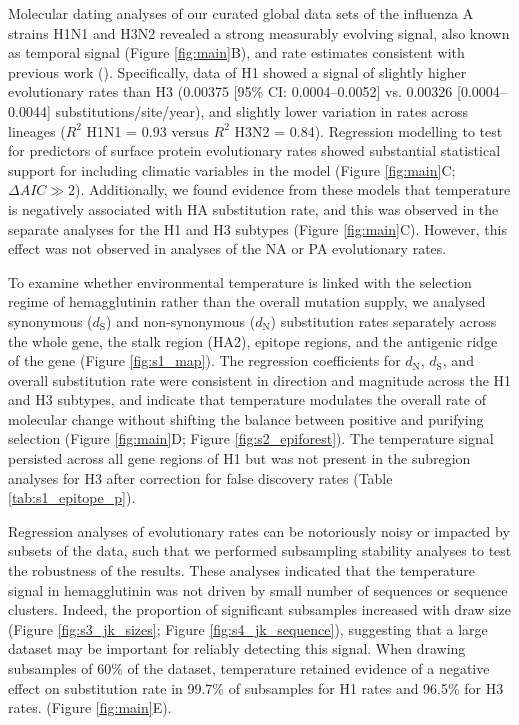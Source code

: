 \documentclass[11pt, a4paper]{article}
\begin{document}
Molecular dating analyses of our curated global data sets of the influenza A strains H1N1 and H3N2 revealed a strong measurably evolving signal, also known as temporal signal (Figure \ref{fig:main}B), and rate estimates consistent with previous work (\cite{phyu_evolutionary_2022, al_khatib_evolution_2018}). Specifically, data of H1 showed a signal of slightly higher evolutionary rates than H3 (0.00375 [95\% CI: 0.0004–0.0052] vs. 0.00326 [0.0004–0.0044] substitutions/site/year), and slightly lower variation in rates across lineages ($R^2$ H1N1 = 0.93 versus $R^2$ H3N2 = 0.84). Regression modelling to test for predictors of surface protein evolutionary rates showed substantial statistical support for including climatic variables in the model (Figure \ref{fig:main}C; $\Delta AIC \gg 2$). Additionally, we found evidence from these models that temperature is negatively associated with HA substitution rate, and this was observed in the separate analyses for the H1 and H3 subtypes (Figure \ref{fig:main}C). However, this effect was not observed in analyses of the NA or PA evolutionary rates.

To examine whether environmental temperature is linked with the selection regime of hemagglutinin rather than the overall mutation supply, we analysed synonymous ($d_{\text{S}}$) and non-synonymous ($d_{\text{N}}$) substitution rates separately across the whole gene, the stalk region (HA2), epitope regions, and the antigenic ridge of the gene (Figure \ref{fig:s1_map}). The regression coefficients for $d_{\text{N}}$, $d_{\text{S}}$, and overall substitution rate were consistent in direction and magnitude across the H1 and H3 subtypes, and indicate that temperature modulates the overall rate of molecular change without shifting the balance between positive and purifying selection (Figure \ref{fig:main}D; Figure \ref{fig:s2_epiforest}). The temperature signal persisted across all gene regions of H1 but was not present in the subregion analyses for H3 after correction for false discovery rates (Table \ref{tab:s1_epitope_p}).

Regression analyses of evolutionary rates can be notoriously noisy or impacted by subsets of the data, such that we performed subsampling stability analyses to test the robustness of the results. These analyses indicated that the temperature signal in hemagglutinin was not driven by small number of sequences or sequence clusters. Indeed, the proportion of significant subsamples increased with draw size (Figure \ref{fig:s3_jk_sizes}; Figure \ref{fig:s4_jk_sequence}), suggesting that a large dataset may be important for reliably detecting this signal. When drawing subsamples of 60\% of the dataset, temperature retained evidence of a negative effect on substitution rate in 99.7\% of subsamples for H1 rates and 96.5\% for H3 rates. (Figure \ref{fig:main}E).
\end{document}
